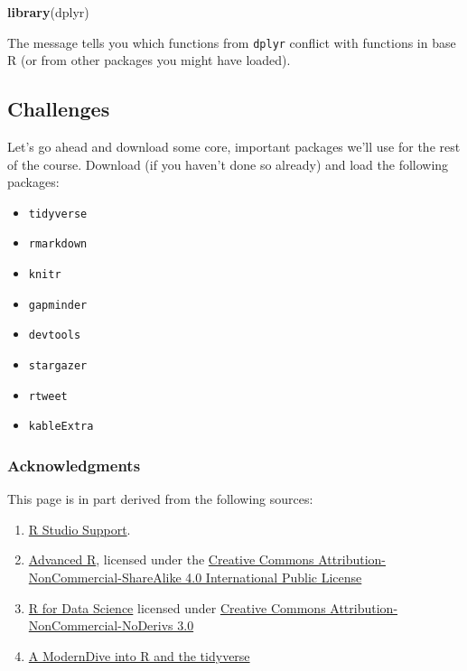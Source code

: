 \documentclass[]{book}
\newenvironment{Shaded}{\begin{snugshade}}{\end{snugshade}}
\newcommand{\KeywordTok}[1]{\textcolor[rgb]{0.13,0.29,0.53}{\textbf{#1}}}
\newcommand{\NormalTok}[1]{#1}
\providecommand{\tightlist}{%
  \setlength{\itemsep}{0pt}\setlength{\parskip}{0pt}}
\begin{document}
\begin{Shaded}
\begin{Highlighting}[]
\KeywordTok{library}\NormalTok{(dplyr)}
\end{Highlighting}
\end{Shaded}

The message tells you which functions from \texttt{dplyr} conflict with
functions in base R (or from other packages you might have loaded).

\subsection{Challenges}\label{challenges}

Let's go ahead and download some core, important packages we'll use for
the rest of the course. Download (if you haven't done so already) and
load the following packages:

\begin{itemize}
\tightlist
\item
  \texttt{tidyverse}
\item
  \texttt{rmarkdown}
\item
  \texttt{knitr}
\item
  \texttt{gapminder}
\item
  \texttt{devtools}
\item
  \texttt{stargazer}
\item
  \texttt{rtweet}
\item
  \texttt{kableExtra}
\end{itemize}

\subsubsection*{Acknowledgments}\label{acknowledgments-1}

This page is in part derived from the following sources:

\begin{enumerate}
\def\labelenumi{\arabic{enumi}.}
\item
  \href{https://support.rstudio.com/hc/en-us/articles/200484448}{R
  Studio Support}.
\item
  \href{https://adv-r.hadley.nz/}{Advanced R}, licensed under the
  \href{https://creativecommons.org/licenses/by-nc-sa/4.0/}{Creative
  Commons Attribution-NonCommercial-ShareAlike 4.0 International Public
  License}
\item
  \href{https://r4ds.had.co.nz}{R for Data Science} licensed under
  \href{https://creativecommons.org/licenses/by-nc-nd/3.0/us/}{Creative
  Commons Attribution-NonCommercial-NoDerivs 3.0}
\item
  \href{https://moderndive.netlify.com/1-getting-started.html}{A
  ModernDive into R and the tidyverse}
\end{enumerate}
\end{document}
